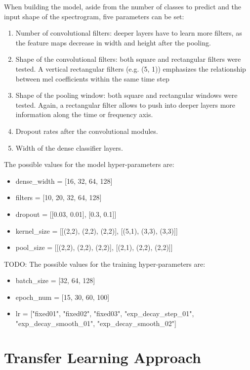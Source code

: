 When building the model, aside from the number of classes to predict and the
input shape of the spectrogram, five parameters can be set:
\begin{enumerate}
    \item Number of convolutional filters: deeper layers have to learn more
        filters, as the feature maps decrease in width and height after the
        pooling.
    \item Shape of the convolutional filters:
        both square and rectangular filters were tested.
        A vertical rectangular filters (e.g. (5, 1)) emphasizes the
        relationship between mel coefficients within the same time step
    \item Shape of the pooling window: 
        both square and rectangular windows were tested.
        Again, a rectangular filter allows to push into deeper layers more
        information along the time or frequency axis.
    \item Dropout rates after the convolutional modules.
    \item Width of the dense classifier layers.
\end{enumerate}
The possible values for the model hyper-parameters are:
\begin{itemize}
    \item dense\_width = [16, 32, 64, 128]
    \item filters = [10, 20, 32, 64, 128]
    \item dropout = [[0.03, 0.01],  [0.3, 0.1]]
    \item kernel\_size = [[(2,2), (2,2), (2,2)], [(5,1), (3,3), (3,3)]]
    \item pool\_size = [[(2,2), (2,2), (2,2)], [(2,1), (2,2), (2,2)]]
\end{itemize}
TODO:
The possible values for the training hyper-parameters are:
\begin{itemize}
    \item batch\_size = [32, 64, 128]
    \item epoch\_num = [15, 30, 60, 100]
    \item lr = ["fixed01", "fixed02", "fixed03",
        "exp\_decay\_step\_01", "exp\_decay\_smooth\_01",
    "exp\_decay\_smooth\_02"]
\end{itemize}

\section{Transfer Learning Approach}
\label{sec:transfer_learning}

